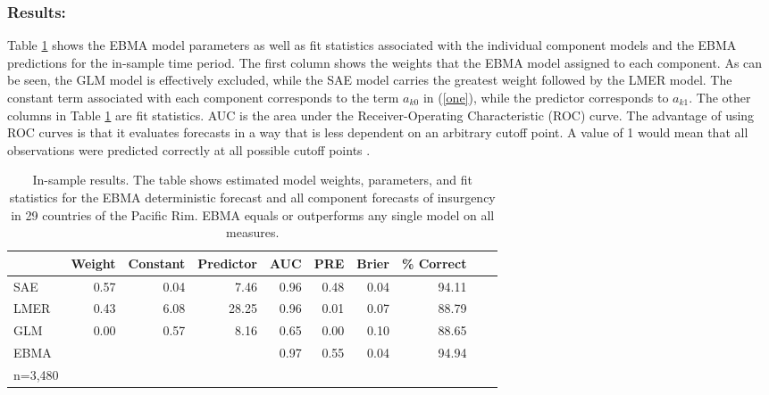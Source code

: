\documentclass[12pt,fullpage]{article}
\begin{document}
\subsubsection{Results:}

Table \ref{InSam1} shows the EBMA model parameters as well as fit
statistics associated with the individual component models and the
EBMA predictions for the in-sample time period. The first column shows
the weights that the EBMA model assigned to each component. As can be
seen, the GLM model is effectively excluded, while the SAE model
carries the greatest weight followed by the LMER model.  The constant
term associated with each component corresponds to the term $a_{k0}$
in (\ref{one}), while the predictor corresponds to $a_{k1}$.
The other columns in Table \ref{InSam1} are fit statistics.  AUC is
the area under the Receiver-Operating Characteristic (ROC) curve. The
advantage of using ROC curves is that it evaluates forecasts in a way
that is less dependent on an arbitrary cutoff point.  A value of 1
would mean that all observations were predicted correctly at all
possible cutoff points \citep{King:Zeng:2001}.

\begin{table}[h!]
\small
\begin{center}
  \caption{\footnotesize In-sample results.  The table shows estimated
    model weights, parameters, and fit statistics for the EBMA
    deterministic forecast and all component forecasts of insurgency
    in 29 countries of the Pacific Rim.  EBMA equals or outperforms
    any single model on all measures.}\label{InSam1}
\begin{tabular}{lrrrrrrrrr}
  \toprule
 & Weight & Constant & Predictor & AUC & PRE & Brier & \% Correct \\ 
  \midrule
  SAE & 0.57 & 0.04 & 7.46 & 0.96 & 0.48 & 0.04 & 94.11\\ 
  LMER & 0.43 & 6.08 & 28.25 & 0.96 & 0.01 & 0.07 & 88.79\\ 
  GLM & 0.00 & 0.57 & 8.16 & 0.65 & 0.00 & 0.10 & 88.65\\ 
  EBMA &  &  &  & 0.97 & 0.55 & 0.04 & 94.94\\ 
   \bottomrule
n=3,480\\
\end{tabular}
\end{center}
\end{table}
\end{document}
